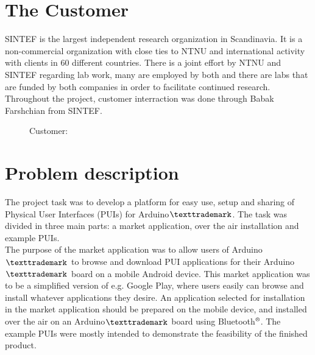 \section{The Customer}
SINTEF is the largest independent research organization in Scandinavia. It is a non-commercial organization with close ties to NTNU and international activity with clients in 60 different countries. There is a joint effort by NTNU and SINTEF regarding lab work, many are employed by both and there are labs that are funded by both companies in order to facilitate continued research. \\
\newline
Throughout the project, customer interraction was done through Babak Farshchian from SINTEF.\\
\begin{figure}[H]
%
\hfill
{}%
\caption{Customer: \protect{\ref{fig:sintef}} \protect{\ref{fig:ntnu}}}
\end{figure}

\section{Problem description}
The project task was to develop a platform for easy use, setup and sharing of Physical User Interfaces (PUIs) for Arduino$\texttrademark$. The task was divided in three main parts: a market application, over the air installation and example PUIs.\\
\newline
The purpose of the market application was to allow users of Arduino$\texttrademark$ to browse and download PUI applications for their Arduino$\texttrademark$ board on a mobile Android device. This market application was to be a simplified version of e.g. Google Play, where users easily can browse and install whatever applications they desire. An application selected for installation in the market application should be prepared on the mobile device, and installed over the air on an Arduino$\texttrademark$ board using Bluetooth$\textsuperscript{\textregistered}$. The example PUIs were mostly intended to demonstrate the feasibility of the finished product.

